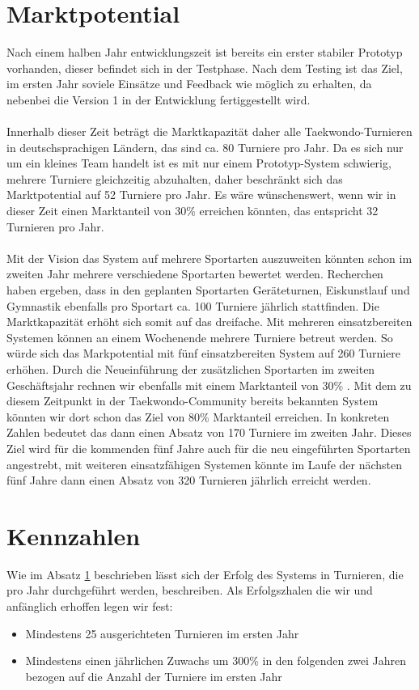 \section{Marktpotential}\label{marktpotential}
Nach einem halben Jahr entwicklungszeit ist bereits ein erster stabiler Prototyp vorhanden, dieser befindet sich in
der Testphase.
Nach dem Testing ist das Ziel, im ersten Jahr soviele Einsätze und Feedback wie möglich zu erhalten, da nebenbei die Version
1 in der Entwicklung fertiggestellt wird.
\\\\
Innerhalb dieser Zeit beträgt die Marktkapazität daher alle Taekwondo-Turnieren in deutschsprachigen Ländern, das
sind ca. 80 Turniere pro Jahr.
Da es sich nur um ein kleines Team handelt ist es mit nur einem Prototyp-System schwierig, mehrere Turniere
	gleichzeitig abzuhalten, daher beschränkt sich das Marktpotential auf 52 Turniere pro Jahr.
Es wäre wünschenswert, wenn wir in dieser Zeit einen Marktanteil von 30\% erreichen könnten, das entspricht 32
	Turnieren pro Jahr.
\\\\
Mit der Vision das System auf mehrere Sportarten auszuweiten könnten schon im zweiten Jahr mehrere verschiedene
	Sportarten bewertet werden.
Recherchen haben ergeben, dass in den geplanten Sportarten Geräteturnen, Eiskunstlauf und Gymnastik ebenfalls pro
	Sportart ca. 100 Turniere jährlich stattfinden.
Die Marktkapazität erhöht sich somit auf das dreifache.
Mit mehreren einsatzbereiten Systemen können an einem Wochenende mehrere Turniere betreut werden.
So würde sich das Markpotential mit fünf einsatzbereiten System auf 260 Turniere erhöhen.
Durch die Neueinführung der zusätzlichen Sportarten im zweiten Geschäftsjahr rechnen wir ebenfalls mit einem
	Marktanteil von 30\% .
Mit dem zu diesem Zeitpunkt in der Taekwondo-Community bereits bekannten System könnten wir dort schon das Ziel von
	80\% Marktanteil erreichen.
In konkreten Zahlen bedeutet das dann einen Absatz von 170 Turniere im zweiten Jahr.
Dieses Ziel wird für die kommenden fünf Jahre auch für die neu eingeführten Sportarten angestrebt, mit weiteren
	einsatzfähigen Systemen könnte im Laufe der nächsten fünf Jahre dann einen Absatz von 320 Turnieren jährlich
	erreicht werden.

\section{Kennzahlen}
Wie im Absatz \ref{marktpotential} beschrieben lässt sich der Erfolg des Systems in Turnieren, die pro Jahr
durchgeführt werden, beschreiben.
Als Erfolgszhalen die wir und anfänglich erhoffen legen wir fest:
\begin{itemize}
	\item Mindestens 25 ausgerichteten Turnieren im ersten Jahr
	\item Mindestens einen jährlichen Zuwachs um 300\% in den folgenden zwei Jahren bezogen auf die Anzahl der
	Turniere im ersten Jahr
\end{itemize}


